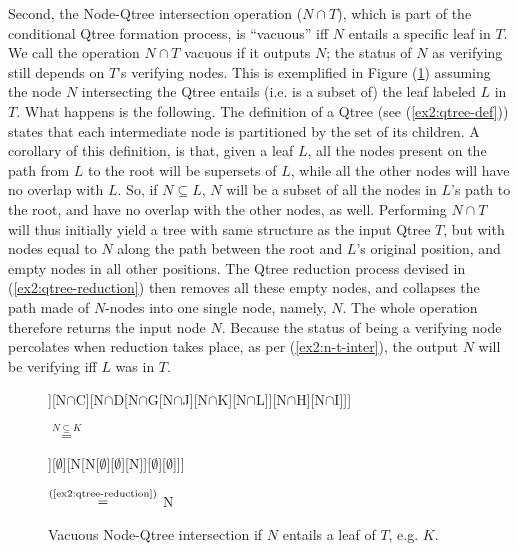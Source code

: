 Second, the Node-Qtree intersection operation ($N\cap T$), which is part of the conditional Qtree formation process, is ``vacuous'' iff $N$ entails a specific leaf in $T$. We call the operation $N \cap T$ vacuous if it outputs $N$; the status of $N$ as verifying still depends on $T$'s verifying nodes. This is exemplified in Figure (\ref{fig2:vacuous-tree-node-inter}) assuming the node $N$ intersecting the Qtree entails (i.e. is a subset of) the leaf labeled $L$ in $T$. What happens is the following. The definition of a Qtree (see (\ref{ex2:qtree-def})) states that each intermediate node is partitioned by the set of its children. A corollary of this definition, is that, given a leaf $L$, all the nodes present on the path from $L$ to the root will be supersets of $L$, while all the other nodes will have no overlap with $L$. So, if $N \subseteq L$, $N$ will be a subset of all the nodes in $L$'s path to the root, and have no overlap with the other nodes, as well. Performing $N \cap T$ will thus initially yield a tree with same structure as the input Qtree $T$, but with nodes equal to $N$ along the path between the root and $L$'s original position, and empty nodes in all other positions. The Qtree reduction process devised in (\ref{ex2:qtree-reduction}) then removes all these empty nodes, and collapses the path made of $N$-nodes into one single node, namely, $N$. The whole operation therefore returns the input node $N$. Because the status of being a verifying node percolates when reduction takes place, as per (\ref{ex2:n-t-inter}), the output $N$ will be verifying iff $L$ was in $T$.



\begin{figure}[H]
	\centering
	\begin{minipage}[c]{.45\linewidth}
		\centering
		\begin{forest}
			[N$\cap$A[N$\cap$B[N$\cap$E][N$\cap$F]][N$\cap$C][N$\cap$D[N$\cap$G[N$\cap$J][N$\cap$K][N$\cap$L]][N$\cap$H][N$\cap$I]]]
		\end{forest}
	\end{minipage}
	\begin{minipage}[c]{.05\linewidth}
		\centering
		$\stackrel{N \subseteq K}{=}$
	\end{minipage}
	\begin{minipage}[c]{.25\linewidth}
		\centering
		\begin{forest}
			[N[$\emptyset$[$\emptyset$][$\emptyset$]][$\emptyset$][N[N[$\emptyset$][$\emptyset$][N]][$\emptyset$][$\emptyset$]]]
		\end{forest}
	\end{minipage}
	\begin{minipage}[c]{.1\linewidth}
		\centering
		$\stackrel{(\text{\ref{ex2:qtree-reduction}})}{=}$ N
	\end{minipage}
	\caption{Vacuous Node-Qtree intersection if $N$ entails a leaf of $T$, e.g. $K$.}\label{fig2:vacuous-tree-node-inter}
\end{figure}

